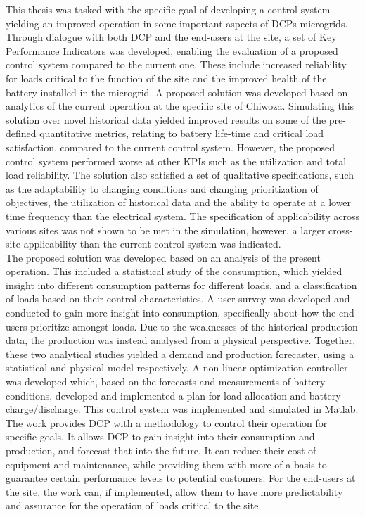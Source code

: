 This thesis was tasked with the specific goal of developing a control system yielding an improved operation in some important aspects of DCPs microgrids. Through dialogue with both DCP and the end-users at the site, a set of Key Performance Indicators was developed, enabling the evaluation of a proposed control system compared to the current one. These include increased reliability for loads critical to the function of the site and the improved health of the battery installed in the microgrid. A proposed solution was developed based on analytics of the current operation at the specific site of Chiwoza. Simulating this solution over novel historical data yielded improved results on some of the pre-defined quantitative metrics, relating to battery life-time and critical load satisfaction, compared to the current control system. However, the proposed control system performed worse at other KPIs such as the utilization and total load reliability. The solution also satisfied a set of qualitative specifications, such as the adaptability to changing conditions and changing prioritization of objectives, the utilization of historical data and the ability to operate at a lower time frequency than the electrical system. The specification of applicability across various sites was not shown to be met in the simulation, however, a larger cross-site applicability than the current control system was indicated.\\

The proposed solution was developed based on an analysis of the present operation. This included a statistical study of the consumption, which yielded insight into different consumption patterns for different loads, and a classification of loads based on their control characteristics. A user survey was developed and conducted to gain more insight into consumption, specifically about how the end-users prioritize amongst loads. Due to the weaknesses of the historical production data, the production was instead analysed from a physical perspective. Together, these two analytical studies yielded a demand and production forecaster, using a statistical and physical model respectively. A non-linear optimization controller was developed which, based on the forecasts and measurements of battery conditions, developed and implemented a plan for load allocation and battery charge/discharge. This control system was implemented and simulated in Matlab\cite{MATLAB}. \\

The work provides DCP with a methodology to control their operation for specific goals. It allows DCP to gain insight into their consumption and production, and forecast that into the future. It can reduce their cost of equipment and maintenance, while providing them with more of a basis to guarantee certain performance levels to potential customers. For the end-users at the site, the work can, if implemented, allow them to have more predictability and assurance for the operation of loads critical to the site.\\

